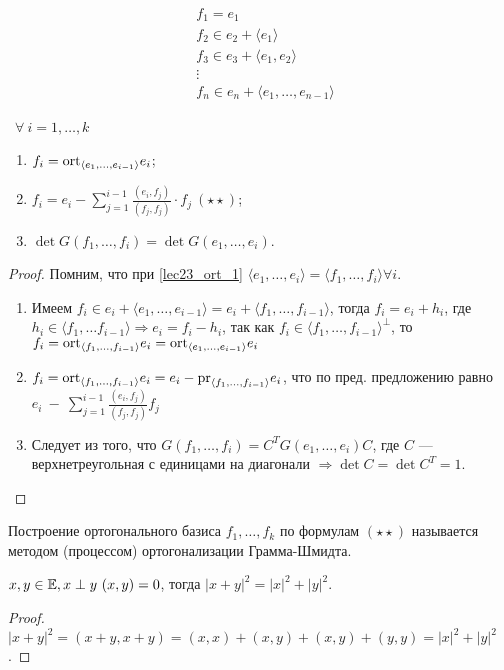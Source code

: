 \[
\tag{$\star$}
\begin{aligned}
  & f_1 = e_1 \\
  & f_2 \in e_2 + \langle  e_{1} \rangle \\
  & f_3 \in e_3 + \langle  e_{1}, e_2 \rangle \\
  & \vdots \\
  & f_n \in e_{n} + \langle  e_{1}, \ldots, e_{n - 1} \rangle
\end{aligned}
\label{lec23_ort_1}
\]

\begin{Suggestion}\
  $\forall\ i = 1, \ldots, k$
  \begin{enumerate}
    \item $f_i = \mathrm{ort}_{\langle e_1, \ldots, e_{i - 1} \rangle} e_i$;
    \item $f_i = e_i - \sum \limits_{j = 1}^{i - 1} \frac{(e_i, f_j)}{(f_j, f_j)} \cdot f_j\ (\star\star)$;
    \item $\det G(f_1, \ldots, f_i) = \det G(e_1, \ldots, e_i)$.
  \end{enumerate}
\end{Suggestion}

\begin{proof}
  Помним, что при \eqref{lec23_ort_1} $\langle e_1, \ldots, e_i \rangle = \langle f_1, \ldots, f_i \rangle \forall i$.
  \begin{enumerate}
    \item Имеем $f_i \in e_i + \langle e_1, \ldots, e_{i - 1} \rangle = e_i + \langle f_1, \ldots, f_{i - 1} \rangle$, тогда $f_i = e_i + h_i$, где $h_i \in \langle f_1, \ldots f_{i - 1} \rangle \Rightarrow e_i = f_i - h_i$, так как $f_i \in \langle f_1, \ldots, f_{i - 1} \rangle^{\perp}$, то $f_i = \mathrm{ort}_{\langle f_1, \ldots, f_{i - 1}\rangle }e_i = \mathrm{ort}_{\langle e_1, \ldots, e_{i - 1} \rangle}e_i$
    \item $f_i = \mathrm{ort}_{\langle f_1, \ldots, f_{i - 1} \rangle} e_i = e_i - \mathrm{pr}_{\langle f_1, \ldots, f_{i - 1} \rangle} e_i$, что по пред. предложению равно $e_i~-~\sum \limits_{j = 1}^{i - 1} \frac{(e_i, f_j)}{(f_j, f_j)}f_j$ 
    \item Следует из того, что $G(f_1, \ldots, f_i) = C^T G(e_1, \ldots, e_i) C$, где $C$ --- верхнетреугольная с единицами на диагонали $\Rightarrow \det C = \det C^T = 1$.
  \end{enumerate}
\end{proof}

Построение ортогонального базиса $f_1, \ldots, f_k$ по формулам $(\star\star)$ называется методом (процессом) ортогонализации Грамма-Шмидта.

\begin{Suggestion}
  $x, y \in \mathbb{E}, x \perp y\ (x, y) = 0$, тогда $|x + y|^2 = |x|^2 + |y|^2$.
\end{Suggestion}

\begin{proof}
  $|x + y|^2 = (x + y, x + y) = (x, x) + (x, y) + (x, y) + (y, y) = |x|^2 + |y|^2$.
\end{proof}

